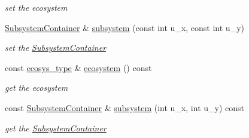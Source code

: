 \begin{DoxyCompactItemize}
\begin{DoxyCompactList}\small\item\em set the ecosystem \end{DoxyCompactList}\item 
\hyperlink{classSubsystemContainer}{SubsystemContainer} \& \hyperlink{classEcosystemContainer_a3a908f8550a2800227774a0fe623593c}{subsystem} (const int u\_\-x, const int u\_\-y)
\begin{DoxyCompactList}\small\item\em set the \hyperlink{classSubsystemContainer}{SubsystemContainer} \end{DoxyCompactList}\item 
\hypertarget{classEcosystemContainer_aa23780e2602c9aea376390c309261288}{
const \hyperlink{classEcosystemContainer_a52c612c138ad2af06dcf353e6c541345}{ecosys\_\-type} \& \hyperlink{classEcosystemContainer_aa23780e2602c9aea376390c309261288}{ecosystem} () const }
\label{classEcosystemContainer_aa23780e2602c9aea376390c309261288}

\begin{DoxyCompactList}\small\item\em get the ecosystem \end{DoxyCompactList}\item 
const \hyperlink{classSubsystemContainer}{SubsystemContainer} \& \hyperlink{classEcosystemContainer_a957ab87f64f41f8c1669f993c1976a85}{subsystem} (int u\_\-x, int u\_\-y) const 
\begin{DoxyCompactList}\small\item\em get the \hyperlink{classSubsystemContainer}{SubsystemContainer} \end{DoxyCompactList}\end{DoxyCompactItemize}
